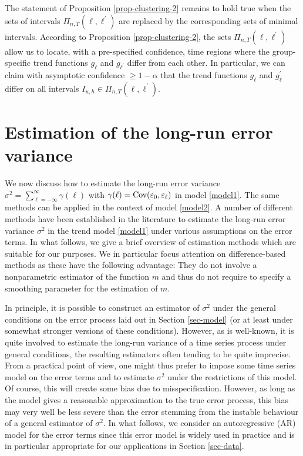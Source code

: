 The statement of Proposition \ref{prop-clustering-2} remains to hold true when the sets of intervals $\Pi_{n,T}(\ell,\ell^\prime)$ are replaced by the corresponding sets of minimal intervals. According to Proposition \ref{prop-clustering-2}, the sets $\Pi_{n,T}(\ell,\ell^\prime)$ allow us to locate, with a pre-specified confidence, time regions where the group-specific trend functions $g_\ell$ and $g_{\ell^\prime}$ differ from each other. In particular, we can claim with asymptotic confidence $\ge 1 - \alpha$ that the trend functions $g_\ell$ and $g_\ell^\prime$ differ on all intervals $I_{u,h} \in \Pi_{n,T}(\ell,\ell^\prime)$. 



\section{Estimation of the long-run error variance}\label{sec-error-var}


We now discuss how to estimate the long-run error variance $\sigma^2 = \sum\nolimits_{\ell=-\infty}^{\infty} \gamma(\ell)$ with $\gamma(\ell) = \textnormal{Cov}(\varepsilon_0,\varepsilon_{\ell})$ in model \eqref{model1}. The same methods can be applied in the context of model \eqref{model2}. A number of different methods have been established in the literature to estimate the long-run error variance $\sigma^2$ in the trend model \eqref{model1} under various assumptions on the error terms. In what follows, we give a brief overview of estimation methods which are suitable for our purposes. We in particular focus attention on difference-based methods as these have the following advantage: They do not involve a nonparametric estimator of the function $m$ and thus do not require to specify a smoothing parameter for the estimation of $m$. 


In principle, it is possible to construct an estimator of $\sigma^2$ under the general conditions on the error process laid out in Section \ref{sec-model} (or at least under somewhat stronger versions of these conditions). However, as is well-known, it is quite involved to estimate the long-run variance of a time series process under general conditions, the resulting estimators often tending to be quite imprecise. From a practical point of view, one might thus prefer to impose some time series model on the error terms and to estimate $\sigma^2$ under the restrictions of this model. Of course, this will create some bias due to misspecification. However, as long as the model gives a reasonable approximation to the true error process, this bias may very well be less severe than the error stemming from the instable behaviour of a general estimator of $\sigma^2$. In what follows, we consider an autoregressive (AR) model for the error terms since this error model is widely used in practice and is in particular appropriate for our applications in Section \ref{sec-data}. 


